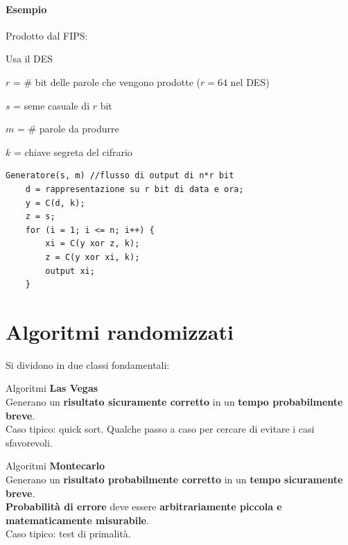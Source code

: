\documentclass[10pt]{book}
\begin{document}
\paragraph{Esempio} Prodotto dal FIPS:
\begin{list}{}{}
	\item Usa il DES
	\item $r$ = \# bit delle parole che vengono prodotte ($r = 64$ nel DES)
	\item $s$ = seme casuale di $r$ bit
	\item $m$ = \# parole da produrre
	\item $k$ = chiave segreta del cifrario
\end{list}
\pagebreak
\begin{lstlisting}
Generatore(s, m) //flusso di output di n*r bit
	d = rappresentazione su r bit di data e ora;
	y = C(d, k);
	z = s;
	for (i = 1; i <= n; i++) {
		xi = C(y xor z, k);
		z = C(y xor xi, k);
		output xi;
	}
\end{lstlisting}
\section{Algoritmi randomizzati}
Si dividono in due classi fondamentali:
\begin{list}{}{}
	\item Algoritmi \textbf{Las Vegas}\\
	Generano un \textbf{risultato sicuramente corretto} in un \textbf{tempo probabilmente breve}.\\
	Caso tipico: quick sort. Qualche passo a caso per cercare di evitare i casi sfavorevoli.
	\item Algoritmi \textbf{Montecarlo}\\
	Generano un \textbf{risultato probabilmente corretto} in un \textbf{tempo sicuramente breve}.\\
	\textbf{Probabilità di errore} deve essere \textbf{arbitrariamente piccola e matematicamente misurabile}.\\
	Caso tipico: test di primalità.
\end{list}
\end{document}
